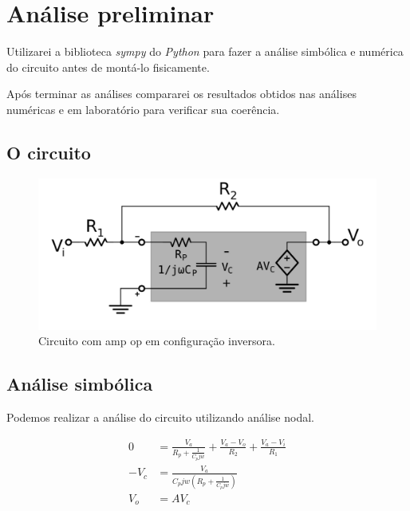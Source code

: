 \section{Análise preliminar}

Utilizarei a biblioteca \emph{sympy} do \emph{Python} para fazer a análise simbólica e numérica do circuito antes de montá-lo fisicamente.

Após terminar as análises compararei os resultados obtidos nas análises numéricas e em laboratório para verificar sua coerência.

\subsection{O circuito}

\begin{figure}[h]
    \centering
    \includegraphics[width=1\columnwidth]{images/circuito.png}
    \caption{Circuito com amp op em configuração inversora.}
\end{figure}


\newpage
\subsection{Análise simbólica}


Podemos realizar a análise do circuito utilizando análise nodal.


\begin{equation}
    \begin{aligned}
        0       & = \frac{V_{a}}{R_{p} + \frac{1}{C_{p} j w}} + \frac{V_{a} - V_{o}}{R_{2}} + \frac{V_{a} - V_{i}}{R_{1}} \\
        - V_{c} & = \frac{V_{a}}{C_{p} j w \left(R_{p} + \frac{1}{C_{p} j w}\right)}                                      \\
        V_{o}   & = A V_{c}
    \end{aligned}
\end{equation}


